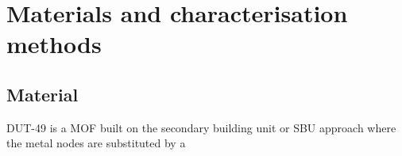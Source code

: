 
\section{Materials and characterisation methods}

\subsection{Material}

DUT-49 is a MOF built on the secondary building unit or SBU approach
where the metal nodes are substituted by a 